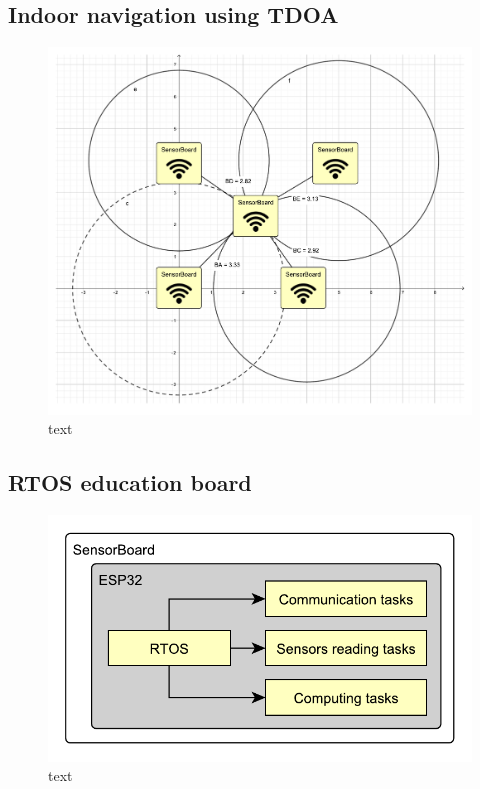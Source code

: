 \subsection{Indoor navigation using TDOA}

\begin{figure}[H]
	\centering
	\label{UELogging1}
	\caption{text}
	\includegraphics[trim=5cm 6cm 5cm 5cm, clip, width=16cm]{img/UsageExamplesTDOA.pdf}
\end{figure}

\subsection{RTOS education board}

\begin{figure}[H]
	\centering
	\label{UELogging1}
	\caption{text}
	\includegraphics[scale=1]{img/UsageExamplesRTOS.pdf}
\end{figure}

